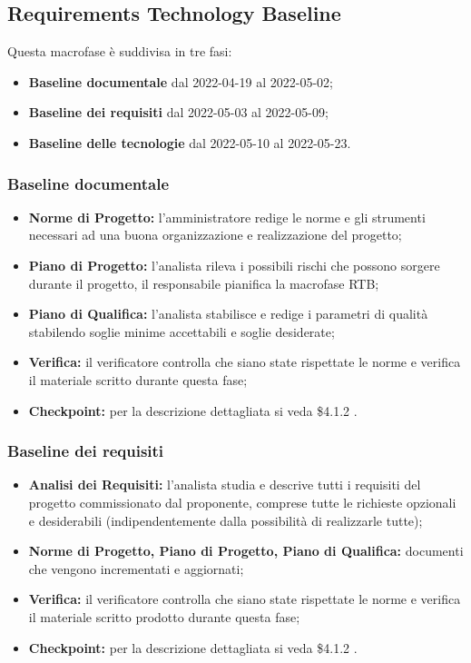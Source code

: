 \subsection{Requirements Technology Baseline}
Questa macrofase è suddivisa in tre fasi:
\begin{itemize}
    \item \textbf{Baseline documentale} dal 2022-04-19 al 2022-05-02;
    \item \textbf{Baseline dei requisiti} dal 2022-05-03 al 2022-05-09;
    \item \textbf{Baseline delle tecnologie} dal 2022-05-10 al 2022-05-23.
\end{itemize}

\subsubsection{Baseline documentale}
\begin{itemize}
    \item \textbf{Norme di Progetto:} l'amministratore redige le norme e gli strumenti necessari ad una buona organizzazione e realizzazione del progetto;
    \item \textbf{Piano di Progetto:} l'analista rileva i possibili rischi che possono sorgere durante il progetto, il responsabile pianifica la macrofase RTB;
    \item \textbf{Piano di Qualifica:} l'analista stabilisce e redige i parametri di qualità stabilendo soglie minime accettabili e soglie desiderate; 
    \item \textbf{Verifica:} il verificatore controlla che siano state rispettate le norme e verifica il materiale scritto durante questa fase;
    \item \textbf{Checkpoint:} per la descrizione dettagliata si veda \$4.1.2 . 
\end{itemize}

\subsubsection{Baseline dei requisiti}
\begin{itemize}
    \item \textbf{Analisi dei Requisiti:} l'analista studia e descrive tutti i requisiti del progetto commissionato dal proponente, 
                comprese tutte le richieste opzionali e desiderabili (indipendentemente dalla possibilità di realizzarle tutte);
    \item \textbf{Norme di Progetto, Piano di Progetto, Piano di Qualifica:} documenti che vengono incrementati e aggiornati;
    \item \textbf{Verifica:} il verificatore controlla che siano state rispettate le norme e verifica il materiale scritto prodotto durante questa fase;
    \item \textbf{Checkpoint:} per la descrizione dettagliata si veda \$4.1.2 .
\end{itemize}


